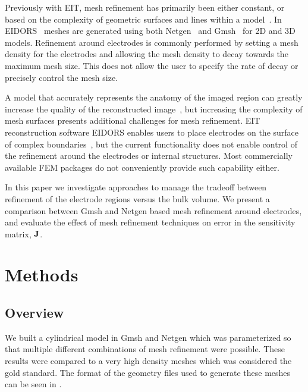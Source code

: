 Previously with EIT, mesh refinement has primarily been either 
constant, or based on 
the complexity of geometric surfaces and lines within a model~\parencite{grychtol_fem_2013}.  
In EIDORS~\parencite{adler_uses_2006} meshes are generated using both 
Netgen~\parencite{schoberl_netgen_1997} and Gmsh~\parencite{geuzaine_gmsh_2009} 
for 2D and 3D models. 
Refinement around electrodes is commonly performed by 
setting a mesh density for the electrodes and allowing the mesh density to 
decay towards the maximum mesh size. This does not allow the user to specify 
the rate of decay or precisely control the mesh size.   

A model that accurately represents the anatomy of the imaged region 
can greatly increase the quality of the reconstructed image~\parencite{grychtol_impact_2012},
but increasing the complexity of mesh surfaces presents additional challenges for
mesh refinement.  EIT reconstruction software EIDORS enables users to place electrodes on the surface of complex 
boundaries~\parencite{grychtol_fem_2013}, but the current functionality does not  
enable control of the refinement around the electrodes or internal 
structures.
Most commercially available FEM packages
do not conveniently provide such capability either.

In this paper we investigate approaches to manage the tradeoff
between refinement of the electrode regions versus the bulk volume. 
We present a comparison between Gmsh and 
Netgen based mesh refinement around electrodes, and evaluate the 
effect of mesh refinement techniques on error in  the sensitivity matrix, 
$\bf J$. 

\section{Methods}
\subsection{Overview}

We built a cylindrical model in Gmsh and Netgen which was parameterized so that multiple
different combinations of mesh refinement were possible.
These results were compared to a very high density meshes which was considered the gold standard.
The format of the geometry files used to generate these meshes can be seen in .

